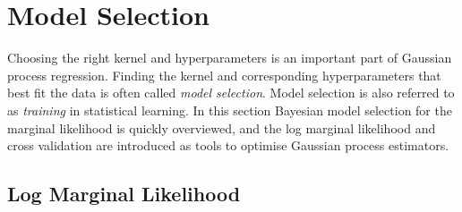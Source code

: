 \documentclass[twoside,english]{uiofysmaster}
\begin{document}
{{\section{Model Selection}

Choosing the right kernel and hyperparameters is an important part of Gaussian process regression. Finding the  kernel and corresponding hyperparameters that best fit the data is often called \textit{model selection}. Model selection is also referred to as \textit{training} in statistical learning. In this section Bayesian model selection for the marginal likelihood is quickly overviewed, and the log marginal likelihood and cross validation are introduced as tools to optimise Gaussian process estimators.

\subsection{Log Marginal Likelihood}\label{Sec:: gaussian process : Log Marginal Likelihood}

}}
\end{document}
